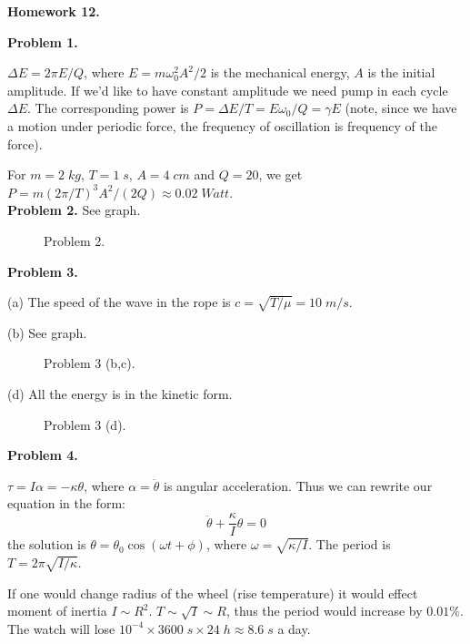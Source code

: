 \documentclass[12pt]{article}
\begin{document}
\begin{center}
{\bf\large Homework 12.}
\end{center}

{\bf Problem 1.}

$\Delta E=2\pi E/Q$, where $E=m\omega_0^2 A^2/2$ is the mechanical energy, $A$ is the initial amplitude. If we'd like to have constant amplitude we need pump in each cycle $\Delta E$.
The corresponding power is $P=\Delta E/T=E\omega_0/Q=\gamma E$ (note, since we have 
a motion under periodic force, the  frequency of oscillation is frequency of the force).

For $m=2\;kg$, $T=1\;s$, $A=4\;cm$ and $Q=20$, we get $P=m(2\pi/T)^3 A^2/(2Q)\approx0.02\;Watt$.
\\

{\bf Problem 2.}   See graph.

\begin{figure}[p]
\begin{center}
\caption{Problem 2.}
\end{center}
\end{figure}


{\bf Problem 3.}

(a) The speed of the wave in the rope is $c=\sqrt{T/\mu}=10\;m/s$.

(b) See graph.
\begin{figure}[h]
\begin{center}
\caption{Problem 3 (b,c).}
\end{center}
\end{figure}

(d) All the energy is in the  kinetic form.
\begin{figure}[h]
\begin{center}
\caption{Problem 3 (d).}
\end{center}
\end{figure}

{\bf Problem 4.}

$\tau=I\alpha=-\kappa\theta$, where $\alpha =\ddot{\theta}$ is angular acceleration.
Thus we can rewrite our equation in the form:
$$\ddot{\theta}+\frac{\kappa}{I}\theta=0$$
the solution is $\theta=\theta_0 \cos\left(\omega t +\phi \right)$, where $\omega=\sqrt{\kappa/I}$.
The period is $T=2\pi\sqrt{I/\kappa}$.

If one would change radius of the wheel (rise temperature) it would effect moment of inertia $I\sim R^2$. $T\sim\sqrt{I}\sim R$, thus the period would increase by $0.01\%$. The watch will lose
$10^{-4}\times 3600\;s\times 24\;h\approx 8.6\;s$ a day.
\end{document}
